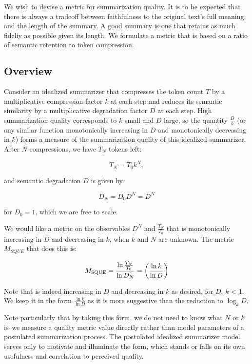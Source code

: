 \documentclass{article}
\begin{document}
We wish to devise a metric for summarization quality. 
It is to be expected that there is always a tradeoff between faithfulness to the original text's full meaning, and the length of the summary.
A good summary is one that retains as much fideliy as possible given its length.
We formulate a metric that is based on a ratio of semantic retention to token compression.

\subsection{Overview}
Consider an idealized summarizer that compresses the token count $T$ by a multiplicative compression factor $k$ at each step and reduces its semantic similarity by a multiplicative degradation factor $D$ at each step.  
High summarization quality corresponds to $k$ small and $D$ large, so the quantity $\frac{D}{k}$ (or any similar function monotonically increasing in $D$ and monotonically decreasing in $k$) forms a measure of the summarization quality of this idealized summarizer. After $N$ compressions, we have $T_N$ tokens left:

\begin{equation}
	\label{eq:tokencount}
    T_N = T_0 k^N,
\end{equation}

and semantic degradation $D$ is given by

\begin{equation}
	\label{eq:degradationsteps}
	D_N = D_0 D^N = D^N
\end{equation}

for $D_0=1$, which we are free to scale.

We would like a metric on the observables $D^N$ and $\frac{T_N}{T_0}$ that is monotonically increasing in $D$ and decreasing in $k$, when $k$ and $N$ are unknown. 
The metric $M_{SQUE}$ that does this is:

\begin{equation}
M_{\rm SQUE} = \frac{\ln\frac{T_N}{T_0} }{\ln D_N } =  \left(  \frac{\ln k}{\ln D} \right)
\end{equation}

Note that is indeed increasing in $D$ and decreasing in $k$ as desired, for $D$, $k$ < 1.
We keep it in the form $\frac{\ln k}{\ln D}$ as it is more suggestive than the reduction to $\log_k D$.

Note particularly that by taking this form, we do not need to know what $N$ or $k$ is--we measure a quality metric value directly rather than model parameters of a postulated summarization process.  
The postulated idealized summarizer model serves only to motivate and illuminate the form, which stands or falls on its own usefulness and correlation to perceived quality.
\end{document}
